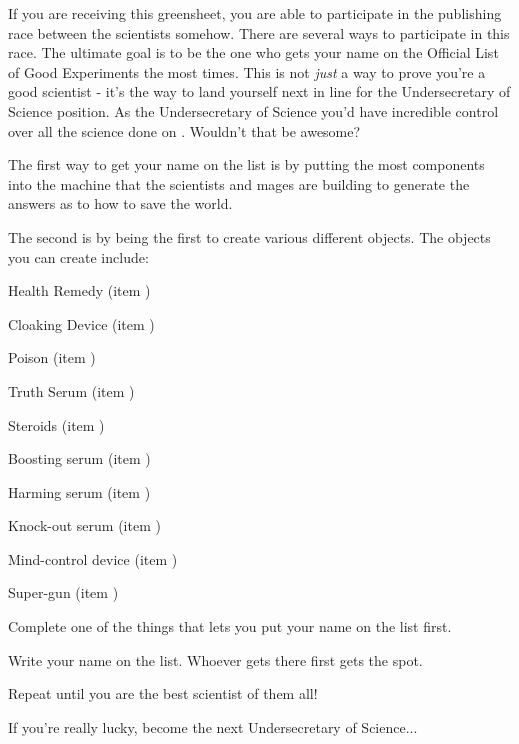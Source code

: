 \documentclass[green]{guildcamp3}
\begin{document}
	
	\name{\gSPublishing{}}
	
	
	
	If you are receiving this greensheet, you are able to participate in the publishing race between the scientists somehow. There are several ways to participate in this race. The ultimate goal is to be the one who gets your name on the Official List of Good Experiments the most times. This is not \emph{just} a way to prove you're a good scientist - it's the way to land yourself next in line for the Undersecretary of Science position. As the Undersecretary of Science you'd have incredible control over all the science done on \bTechWorld{}. Wouldn't that be awesome?
	
	The first way to get your name on the list is by putting the most components into the machine that the scientists and mages are building to generate the answers as to how to save the world.
	
	The second is by being the first to create various different objects. The objects you can create include:

	Health Remedy (item \iHealthRemedy{\MYnumber})
	
	Cloaking Device (item \iCloakingDevice{\MYnumber})
	
	Poison (item \iTechPoison{\MYnumber})
	
	Truth Serum (item \iTruthSerum{\MYnumber})
	
	Steroids (item \iSteroids{\MYnumber})
	
	Boosting serum (item \iCRUpSerum{\MYnumber})
	
	Harming serum (item \iCRDownSerum{\MYnumber})
	
	Knock-out serum (item \iSonicKO{\MYnumber})
	
	Mind-control device (item \iMCDevice{\MYnumber})
	
	Super-gun (item \iUpgradedTechGun{})

	
	\begin{enum}[Directions]
		\item Complete one of the things that lets you put your name on the list first.
		\item Write your name on the list. Whoever gets there first gets the spot. 
		\item Repeat until you are the best scientist of them all!
		\item If you're really lucky, become the next Undersecretary of Science...
	\end{enum}
	
	
\end{document}
